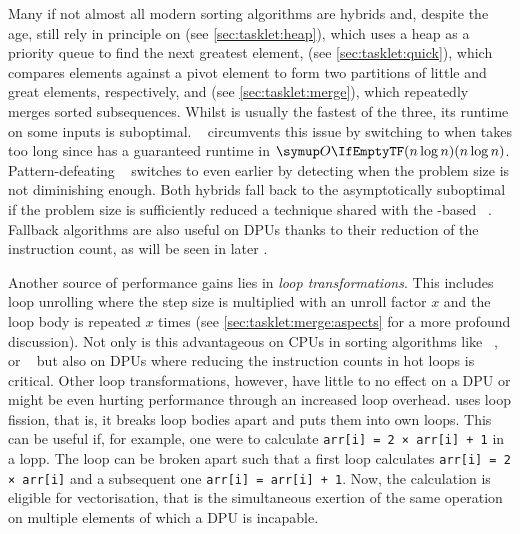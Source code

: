 Many if not almost all modern sorting algorithms are hybrids and, despite the age, still rely in principle on \emph{\HS{}} (see \cref{sec:tasklet:heap}), which uses a heap as a priority queue to find the next greatest element, \emph{\QS{}} (see \cref{sec:tasklet:quick}), which compares elements against a pivot element to form two partitions of little and great elements, respectively, and \emph{\MS{}} (see \cref{sec:tasklet:merge}), which repeatedly merges sorted subsequences.
Whilst \QS{} is usually the fastest of the three, its runtime on some inputs is suboptimal.
\IntroS{}~\cite{musser1999introspective} circumvents this issue by switching to \HS{} when \QS{} takes too long since \HS{} has a guaranteed runtime in \(\bigoh{n \log n}\).
Pattern-defeating \QS{}~\cite{peters2021patterndefeatingquicksort} switches to \HS{} even earlier by detecting when the problem size is not diminishing enough.
Both hybrids fall back to the asymptotically suboptimal \IS{} if the problem size is sufficiently reduced \Dash a technique shared with the \MS{}-based \TS{}~\cite{peters2002timsort}.
Fallback algorithms are also useful on \acp{DPU} thanks to their reduction of the instruction count, as will be seen in later .

Another source of performance gains lies in \emph{loop transformations}.
This includes loop unrolling where the step size is multiplied with an unroll factor \(x\) and the loop body is repeated \(x\) times (see \cref{sec:tasklet:merge:aspects} for a more profound discussion).
Not only is this advantageous on \acp{CPU} in sorting algorithms like \IPSo{}~\cite{axtmann2020engineering}, \SSSSS{}~\cite{bingmann2015engineering} or \SkaS{}~\cite{skarupke2016ska} but also on \acp{DPU} where reducing the instruction counts in hot loops is critical.
Other loop transformations, however, have little to no effect on a \ac{DPU} or might be even hurting performance through an increased loop overhead.
\SSSSS{} uses loop fission, that is, it breaks loop bodies apart and puts them into own loops.
This can be useful if, for example, one were to calculate \lstinline|arr[i] = 2 × arr[i] + 1| in a lopp.
The loop can be broken apart such that a first loop calculates \lstinline|arr[i] = 2 × arr[i]| and a subsequent one \lstinline|arr[i] = arr[i] + 1|.
Now, the calculation is eligible for vectorisation, that is the simultaneous exertion of the same operation on multiple elements of which a \ac{DPU} is incapable.

